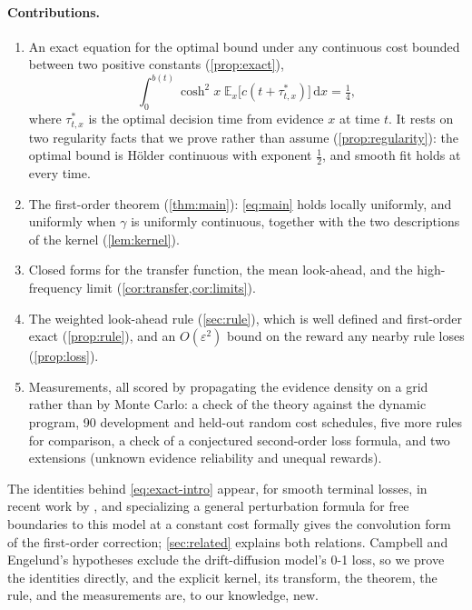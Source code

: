 \documentclass[11pt]{article}
\theoremstyle{definition}
\theoremstyle{remark}
\newcommand{\E}{\mathbb{E}}
\newcommand{\dd}{\,\mathrm{d}}
\begin{document}
\paragraph{Contributions.}
\begin{enumerate}
  \item An exact equation for the optimal bound under any continuous cost bounded between two
    positive constants (\cref{prop:exact}),
    \begin{equation}
      \int_0^{b(t)} \cosh^2 x\;\E_x\bigl[c(t + \tau^*_{t,x})\bigr]\dd x = \tfrac14,
      \label{eq:exact-intro}
    \end{equation}
    where $\tau^*_{t,x}$ is the optimal decision time from evidence $x$ at time $t$. It rests on
    two regularity facts that we prove rather than assume (\cref{prop:regularity}): the optimal
    bound is Hölder continuous with exponent $\tfrac12$, and smooth fit holds at every time.
  \item The first-order theorem (\cref{thm:main}): \eqref{eq:main} holds locally uniformly, and
    uniformly when $\gamma$ is uniformly continuous, together with the two descriptions of the
    kernel (\cref{lem:kernel}).
  \item Closed forms for the transfer function, the mean look-ahead, and the high-frequency limit
    (\cref{cor:transfer,cor:limits}).
  \item The weighted look-ahead rule (\cref{sec:rule}), which is well defined and first-order
    exact (\cref{prop:rule}), and an $O(\varepsilon^2)$ bound on the reward any nearby rule loses
    (\cref{prop:loss}).
  \item Measurements, all scored by propagating the evidence density on a grid rather than by
    Monte Carlo: a check of the theory against the dynamic program, 90 development and
    \HeldCount{} held-out random cost schedules, five more rules for comparison, a check of a
    conjectured second-order loss formula, and two extensions (unknown evidence reliability and
    unequal rewards).
\end{enumerate}
The identities behind \eqref{eq:exact-intro} appear, for smooth terminal losses, in recent work by
\citet{campbell2026}, and specializing a general perturbation formula for free boundaries
\citep{stojanovic1997} to this model at a constant cost formally gives the convolution form of the
first-order correction; \cref{sec:related} explains both relations. Campbell and Engelund's
hypotheses exclude the drift-diffusion model's 0-1 loss, so we prove the identities directly, and the
explicit kernel, its transform, the theorem, the rule, and the measurements are, to our knowledge,
new.
\end{document}

